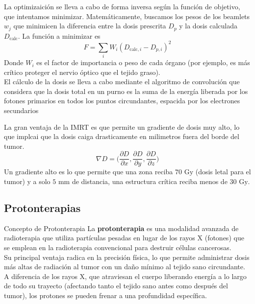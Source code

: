 \documentclass{beamer}
\begin{document}
\begin{frame}
    La optimizaición se lleva a cabo de forma inversa según la función de objetivo, que intentamos minimizar. Matemáticamente, buscamos los pesos de los beamlets $w_j$ que minimicen la diferencia entre la dosis prescrita $D_p$ y la dosis calculada $D_{\text{calc}}$. La función a minimizar es
    \begin{equation}
        F=\sum_i
W_i(D_{\text{calc},i}-D_{p,i})^2    \end{equation}
Donde $W_i$ es el factor de importancia o peso de cada órgano (por ejemplo, es más crítico proteger el nervio óptico que el tejido graso).
\\

El cálculo de la dosis se lleva a cabo  mediante el algoritmo de convolución que considera que la dosis total en un purno es la suma de la energía liberada por los fotones primarios en todos los puntos circundantes, espacida por los electrones secundarios
\end{frame}
\begin{frame}
    La gran ventaja de la IMRT es que permite un gradiente de dosis muy alto, lo que implcai que la dosis caiga drasticamente en milimetros fuera del borde del tumor. 
    \begin{equation}
        \nabla D= \Biggl( \frac{\partial D}{\partial x}, \frac{\partial D}{\partial y}, \frac{\partial D}{\partial z}\Biggl)
    \end{equation}
    Un gradiente alto es lo que permite que una zona reciba $70 \text{ Gy}$ (dosis letal para el tumor) y a solo $5 \text{ mm}$ de distancia, una estructura crítica reciba menos de $30 \text{ Gy}$.
\end{frame}

\subsection{Protonterapias}
\begin{frame}{Concepto de Protonterapia}
La \textbf{protonterapia}  es una modalidad avanzada de radioterapia que utiliza partículas pesadas en lugar de los rayos X (fotones) que se emplean en la radioterapia convencional para destruir células cancerosas.
\\
Su principal ventaja radica en la precisión física, lo que permite administrar dosis más altas de radiación al tumor con un daño mínimo al tejido sano circundante.
\\
A diferencia de los rayos X, que atraviesan el cuerpo liberando energía a lo largo de todo su trayecto (afectando tanto el tejido sano antes como después del tumor), los protones se pueden frenar a una profundidad específica.
\end{frame}
\end{document}
